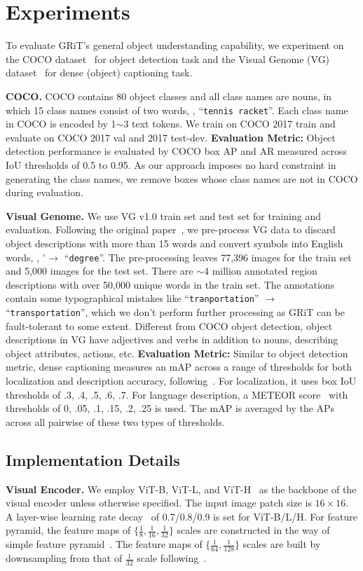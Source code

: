 \documentclass[10pt,twocolumn,letterpaper]{article}
\newcommand{\myparagraph}[1]{{\vspace{0.5em} \noindent \bf #1}}
\begin{document}
\section{Experiments}
To evaluate GRiT's general object understanding capability, we experiment on the COCO dataset~\cite{lin2014microsoft} for object detection task and the Visual Genome (VG) dataset~\cite{krishna2017visual} for dense (object) captioning task.

\myparagraph{COCO.} COCO contains 80 object classes and all class names are nouns, in which 15 class names consist of two words, \eg, ``\texttt{tennis racket}''. Each class name in COCO is encoded by 1$\sim$3 text tokens. We train on COCO 2017 train and evaluate on COCO 2017 val and 2017 test-dev. \textbf{Evaluation Metric:} Object detection performance is evaluated by COCO box AP and AR measured across IoU thresholds of 0.5 to 0.95.
As our approach imposes no hard constraint in generating the class names, we remove boxes whose class names are not in COCO during evaluation.

\myparagraph{Visual Genome.} We use VG v1.0 train set and test set for training and evaluation. Following the original paper~\cite{johnson2016densecap}, we pre-process VG data to discard object descriptions with more than 15 words and convert symbols into English words, \eg, $^{\circ} \rightarrow$ ``\texttt{degree}''. The pre-processing leaves 77,396 images for the train set and 5,000 images for the test set. There are $\sim$4 million annotated region descriptions with over 50,000 unique words in the train set. The annotations contain some typographical mistakes like ``\texttt{tranportation}'' $\rightarrow$ ``\texttt{transportation}'', which we don't perform further processing as GRiT can be fault-tolerant to some extent. Different from COCO object detection, object descriptions in VG have adjectives and verbs in addition to nouns, describing object attributes, actions, etc. \textbf{Evaluation Metric:} Similar to object detection metric, dense captioning measures an mAP across a range of thresholds for both localization and description accuracy, following~\cite{johnson2016densecap}. For localization, it uses box IoU thresholds of .3, .4, .5, .6, .7. For language description, a METEOR score~\cite{laviemeteor} with thresholds of 0, .05, .1, .15, .2, .25 is used. The mAP is averaged by the APs across all pairwise of these two types of thresholds.

\subsection{Implementation Details}
\myparagraph{Visual Encoder.} We employ ViT-B, ViT-L, and ViT-H~\cite{dosovitskiy2020image} as the backbone of the visual encoder unless otherwise specified. The input image patch size is $16\times16$. A layer-wise learning rate decay~\cite{li2022exploring} of 0.7/0.8/0.9 is set for ViT-B/L/H. For feature pyramid, the feature maps of $\{\frac{1}{8},\frac{1}{16},\frac{1}{32}\}$ scales are constructed in the way of simple feature pyramid~\cite{li2022exploring}. The feature maps of $\{\frac{1}{64},\frac{1}{128}\}$ scales are built by downsampling from that of $\frac{1}{32}$ scale following~\cite{zhou2021probabilistic}.
\end{document}
